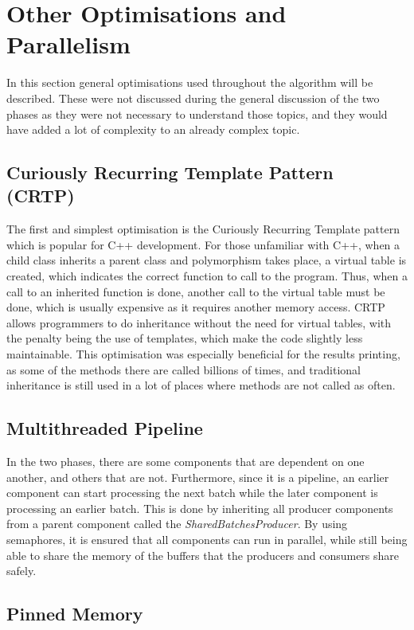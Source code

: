 \section{Other Optimisations and Parallelism}

In this section general optimisations used throughout the algorithm will be described.
These were not discussed during the general discussion of the two phases as they were not necessary to understand those topics, and they would have added a lot of complexity to an already complex topic.

\subsection{Curiously Recurring Template Pattern (CRTP)}

The first and simplest optimisation is the Curiously Recurring Template pattern which is popular for C++ development.
For those unfamiliar with C++, when a child class inherits a parent class and polymorphism takes place, a virtual table is created, which indicates the correct function to call to the program.
Thus, when a call to an inherited function is done, another call to the virtual table must be done, which is usually expensive as it requires another memory access.
CRTP allows programmers to do inheritance without the need for virtual tables, with the penalty being the use of templates, which make the code slightly less maintainable.
This optimisation was especially beneficial for the results printing, as some of the methods there are called billions of times, and traditional inheritance is still used in a lot of places where methods are not called as often.

\subsection{Multithreaded Pipeline}

In the two phases, there are some components that are dependent on one another, and others that are not.
Furthermore, since it is a pipeline, an earlier component can start processing the next batch while the later component is processing an earlier batch.
This is done by inheriting all producer components from a parent component called the \textit{SharedBatchesProducer}.
By using semaphores, it is ensured that all components can run in parallel, while still being able to share the memory of the buffers that the producers and consumers share safely.

\subsection{Pinned Memory}

